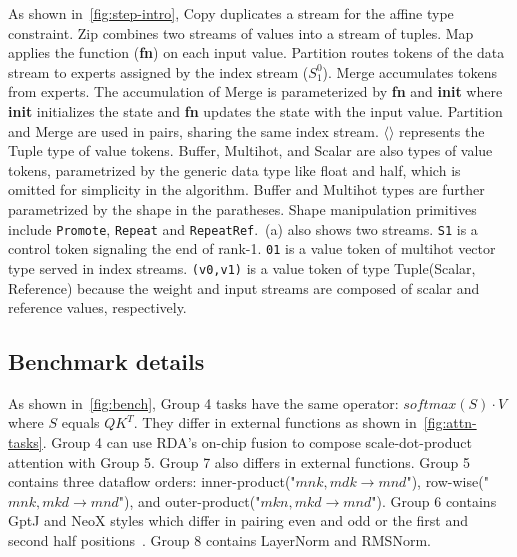 As shown in~\cref{fig:step-intro}, Copy duplicates a stream for the affine type constraint.  Zip combines two streams of values into a stream of tuples. Map applies the function (\textbf{fn}) on each input value. Partition routes tokens of the data stream to experts assigned by the index stream ($S_1^0$). Merge accumulates tokens from experts. The accumulation of Merge is parameterized by \textbf{fn} and \textbf{init} where \textbf{init} initializes the state and \textbf{fn} updates the state with the input value. Partition and Merge are used in pairs, sharing the same index stream. $\langle\rangle$ represents the Tuple type of value tokens. Buffer, Multihot, and Scalar are also types of value tokens, parametrized by the generic data type like float and half, which is omitted for simplicity in the algorithm. Buffer and Multihot types are further parametrized by the shape in the paratheses. Shape manipulation primitives include \texttt{Promote}, \texttt{Repeat} and \texttt{RepeatRef}.~(a) also shows two streams. \texttt{S1} is a control token signaling the end of rank-1. \texttt{01} is a value token of multihot vector type served in index streams. \texttt{(v0,v1)} is a value token of type Tuple(Scalar, Reference) because the weight and input streams are composed of scalar and reference values, respectively.

\newpage
\subsection{Benchmark details}
\label{sec:bench-info}
As shown in~\cref{fig:bench}, Group 4 tasks have the same operator: $softmax(S)\cdot V$ where $S$ equals $QK^T$. They differ in external functions as shown in~\cref{fig:attn-tasks}. Group 4 can use RDA's on-chip fusion to compose scale-dot-product attention with Group 5. Group 7 also differs in external functions. Group 5 contains three dataflow orders: inner-product("$mnk,mdk\rightarrow mnd$"), row-wise("$mnk,mkd \rightarrow mnd$"), and outer-product("$mkn,mkd \rightarrow mnd$"). Group 6 contains GptJ and NeoX styles which differ in pairing even and odd or the first and second half positions~\cite{vllm2023rotary}. Group 8 contains LayerNorm and RMSNorm. 

